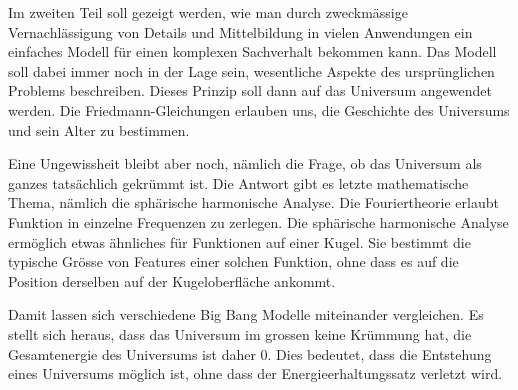 Im zweiten Teil soll gezeigt werden, wie man durch zweckmässige
Vernachlässigung von Details und Mittelbildung in vielen Anwendungen
ein einfaches Modell für einen komplexen Sachverhalt bekommen kann.
Das Modell soll dabei immer noch in der Lage sein, wesentliche
Aspekte des ursprünglichen Problems beschreiben.
Dieses Prinzip soll dann auf das Universum angewendet werden.
Die Friedmann-Gleichungen erlauben uns, die Geschichte des
Universums und sein Alter zu bestimmen.

Eine Ungewissheit bleibt aber noch, nämlich die Frage, ob das
Universum als ganzes tatsächlich gekrümmt ist.
Die Antwort gibt es letzte mathematische Thema, nämlich die
sphärische harmonische Analyse.
Die Fouriertheorie erlaubt Funktion in einzelne Frequenzen zu
zerlegen.
Die sphärische harmonische Analyse ermöglich etwas ähnliches
für Funktionen auf einer Kugel. 
Sie bestimmt die typische Grösse von Features einer solchen
Funktion, ohne dass es auf die Position derselben auf der Kugeloberfläche
ankommt.

Damit lassen sich verschiedene Big Bang Modelle miteinander
vergleichen.
Es stellt sich heraus, dass das Universum im grossen keine Krümmung hat,
die Gesamtenergie des Universums ist daher $0$.
Dies bedeutet, dass die Entstehung eines Universums möglich ist,
ohne dass der Energieerhaltungssatz verletzt wird.




